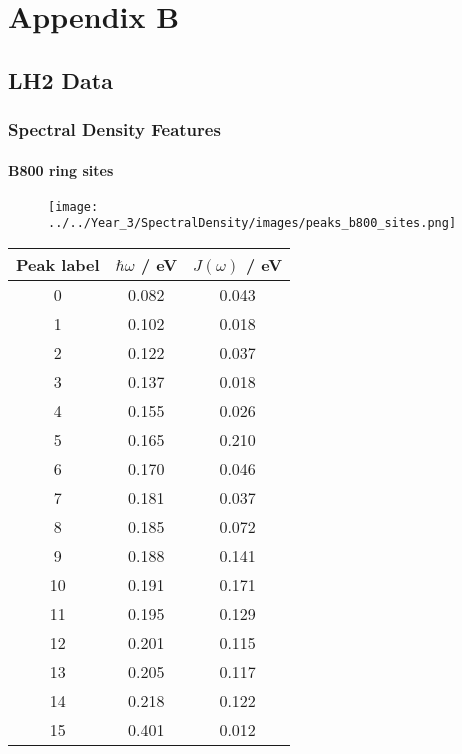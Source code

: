 %
%

\chapter{Appendix B}
\label{app:app02}
\section{LH2 Data}
\label{sec:lh2_data}

\subsection{Spectral Density Features}
\label{subsec:specdens_features}
\subsubsection{B800 ring sites}
\label{subsubsec:specdens_b800}

\begin{figure}
    \centering
    \texttt{[image: ../../Year\_3/SpectralDensity/images/peaks\_b800\_sites.png]}
\end{figure}

\begin{table}
    \centering
    \begin{tabular}{||c c c||}
    \hline
    Peak label & $\hbar \omega$ / eV & $J\left(\omega\right)$ / eV \\
    \hline\hline
    
     0 & 0.082 & 0.043 \\
     1 & 0.102 & 0.018 \\
     2 & 0.122 & 0.037 \\
     3 & 0.137 & 0.018 \\
     4 & 0.155 & 0.026 \\
     5 & 0.165 & 0.210 \\
     6 & 0.170 & 0.046 \\
     7 & 0.181 & 0.037 \\
     8 & 0.185 & 0.072 \\
     9 & 0.188 & 0.141 \\
     10 & 0.191 & 0.171 \\
     11 & 0.195 & 0.129 \\
     12 & 0.201 & 0.115 \\
     13 & 0.205 & 0.117 \\
     14 & 0.218 & 0.122 \\
     15 & 0.401 & 0.012 \\
    \hline 
    \end{tabular}
\end{table}

